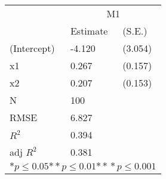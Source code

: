 \begin{tabular}{*{3}{l}}
\hline
                  & \multicolumn{2}{c}{M1}   \tabularnewline
                   &Estimate  &(S.E.)  \tabularnewline
 \hline
 \hline
   (Intercept)     &-4.120   &   (3.054) \tabularnewline
   x1              &0.267   &   (0.157) \tabularnewline
   x2              &0.207   &   (0.153) \tabularnewline
 \hline
 N                 &100       &        \tabularnewline
 RMSE             &6.827         & \tabularnewline
 $R^2$             &0.394         & \tabularnewline
 adj $R^2$         &0.381         & \tabularnewline
 \hline
\hline
 
 \multicolumn{3}{c}{${*  p}\le 0.05$${*\!\!*  p}\le 0.01$${*\!\!*\!\!*  p}\le 0.001$}\tabularnewline
 \end{tabular}